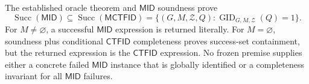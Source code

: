The established oracle theorem and \(\mathsf{MID}\) soundness prove
\[
 \operatorname{Succ}(\mathsf{MID})
 \subseteq\operatorname{Succ}(\mathsf{MCTFID})
 =\{(G,M,\mathcal Z,Q):
 \operatorname{GID}_{G,M,\mathcal Z}(Q)=1\}.
\]
For \(M\ne\varnothing\), a successful \(\mathsf{MID}\) expression is returned literally.  For \(M=\varnothing\), soundness plus conditional \(\mathsf{CTFID}\) completeness proves success-set containment, but the returned expression is the \(\mathsf{CTFID}\) expression.  No frozen premise supplies either a concrete failed \(\mathsf{MID}\) instance that is globally identified or a completeness invariant for all \(\mathsf{MID}\) failures.